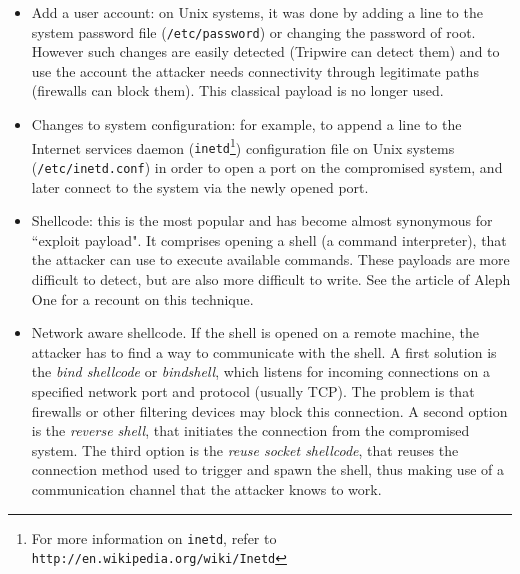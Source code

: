 \documentclass{llncs}
\begin{document}
\begin{itemize}
\item{Add a user account: 
on Unix systems, it was done by adding a line to the system password file ({\tt /etc/password})
or changing the password of root.
However such changes are easily detected (Tripwire can detect them)
and to use the account the attacker needs connectivity through legitimate paths (firewalls can block them).
This classical payload is no longer used.
}
\item{Changes to system configuration:
for example, to append a line to the Internet services daemon ({\tt inetd}\footnote{For more information on {\tt inetd},
refer to {\tt http://en.wikipedia.org/wiki/Inetd}})
configuration file on Unix systems ({\tt /etc/inetd.conf})
in order to open a port on the compromised system, 
and later connect to the system via the newly opened port.
}
\item{Shellcode: this is the most popular and has become almost 
synonymous for ``exploit payload".
It comprises opening a shell (a command interpreter), that the attacker can use
to execute available commands.
These payloads are more difficult to detect, but are also more difficult to write.
See the article of Aleph One \cite{alephone} for a recount on this technique.
}
\item{Network aware shellcode.
If the shell is opened on a remote machine, the attacker has to find a way to communicate with the shell.
A first solution is the \emph{bind shellcode} or \emph{bindshell}, 
which listens for incoming connections on a specified network port and protocol (usually TCP).
The problem is that firewalls or other filtering devices may block this connection.
A second option is the \emph{reverse shell}, that initiates the connection from the compromised system.
The third option is the \emph{reuse socket shellcode}, that reuses the connection method used 
to trigger and spawn the shell, thus making use of a communication channel that the attacker knows to work.
}
\end{itemize}
\end{document}
